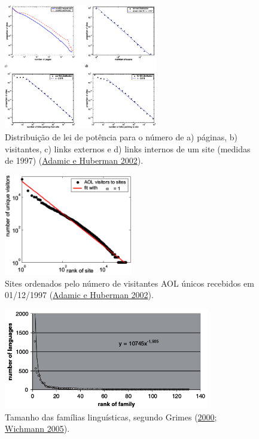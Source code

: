\documentclass[
  ignorenonframetext,
  aspectratio=169]{beamer}
\begin{document}
\begin{frame}
\begin{figure}
\centering
\includegraphics[width=0.6\textwidth,height=\textheight]{adamic-sites.png}
\caption{Distribuição de lei de potência para o número de a) páginas, b)
visitantes, c) links externos e d) links internos de um site (medidas de
1997) (\protect\hyperlink{ref-huberman2002}{Adamic e Huberman 2002}).}
\end{figure}
\end{frame}

\begin{frame}
\begin{figure}
\centering
\includegraphics[width=0.5\textwidth,height=\textheight]{adamic-visitors.png}
\caption{Sites ordenados pelo número de visitantes AOL únicos recebidos
em 01/12/1997 (\protect\hyperlink{ref-huberman2002}{Adamic e Huberman
2002}).}
\end{figure}
\end{frame}

\begin{frame}
\begin{figure}
\centering
\includegraphics[width=0.8\textwidth,height=\textheight]{wichmann2005_familysize.png}
\caption{Tamanho das famílias linguísticas, segundo Grimes
(\protect\hyperlink{ref-grimes2000}{2000};
\protect\hyperlink{ref-wichmann2005}{Wichmann 2005}).}
\end{figure}
\end{frame}
\end{document}
